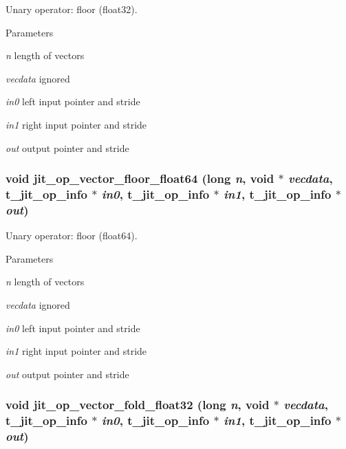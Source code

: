 Unary operator: floor (float32). 
\begin{DoxyParams}{Parameters}
\item[{\em n}]length of vectors \item[{\em vecdata}]ignored \item[{\em in0}]left input pointer and stride \item[{\em in1}]right input pointer and stride \item[{\em out}]output pointer and stride \end{DoxyParams}
\hypertarget{group__opvecmod_ga4dd92a9aaa3d3fa78864561cfa386087}{
\subsubsection[{jit\_\-op\_\-vector\_\-floor\_\-float64}]{\setlength{\rightskip}{0pt plus 5cm}void jit\_\-op\_\-vector\_\-floor\_\-float64 (long {\em n}, \/  void $\ast$ {\em vecdata}, \/  {\bf t\_\-jit\_\-op\_\-info} $\ast$ {\em in0}, \/  {\bf t\_\-jit\_\-op\_\-info} $\ast$ {\em in1}, \/  {\bf t\_\-jit\_\-op\_\-info} $\ast$ {\em out})}}
\label{group__opvecmod_ga4dd92a9aaa3d3fa78864561cfa386087}


Unary operator: floor (float64). 
\begin{DoxyParams}{Parameters}
\item[{\em n}]length of vectors \item[{\em vecdata}]ignored \item[{\em in0}]left input pointer and stride \item[{\em in1}]right input pointer and stride \item[{\em out}]output pointer and stride \end{DoxyParams}
\hypertarget{group__opvecmod_gae5bb9c10649a7549663b2f5f50e057b8}{
\subsubsection[{jit\_\-op\_\-vector\_\-fold\_\-float32}]{\setlength{\rightskip}{0pt plus 5cm}void jit\_\-op\_\-vector\_\-fold\_\-float32 (long {\em n}, \/  void $\ast$ {\em vecdata}, \/  {\bf t\_\-jit\_\-op\_\-info} $\ast$ {\em in0}, \/  {\bf t\_\-jit\_\-op\_\-info} $\ast$ {\em in1}, \/  {\bf t\_\-jit\_\-op\_\-info} $\ast$ {\em out})}}
\label{group__opvecmod_gae5bb9c10649a7549663b2f5f50e057b8}


